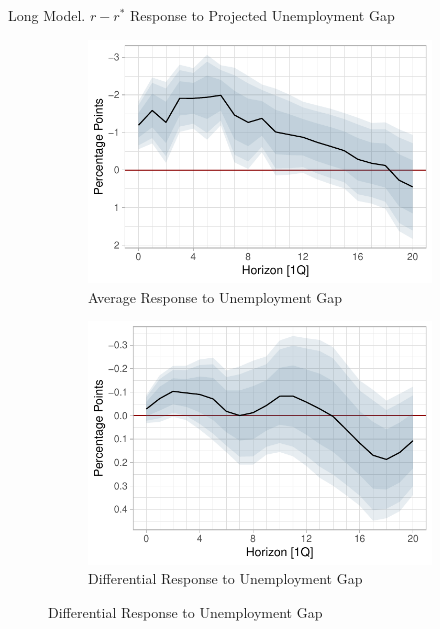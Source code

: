 \documentclass[10pt,aspectratio=169]{beamer}
\begin{document}
\begin{frame}{Long Model. $r-r^*$ Response to Projected Unemployment Gap}

    \begin{figure}[!htbp]\centering
    \begin{minipage}{1\textwidth}
        \caption{}
        \label{fig:LP}
        \begin{subfigure}[b]{0.49\textwidth}
            \centering
            \caption{Average Response to Unemployment Gap}
            \label{fig:LP_long:average_gap}
            \includegraphics[width=\linewidth]{average_unemployment_long.pdf}
        \end{subfigure}
        \hfill
        \begin{subfigure}[b]{0.49\textwidth}
            \centering
            \caption{Differential Response to Unemployment Gap}
            \label{fig:LP_long:differential_gap}
            \includegraphics[width=\linewidth]{differential_unemployment_long.pdf}

\end{subfigure}
\end{minipage}
\end{figure}
\end{frame}
\end{document}
